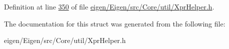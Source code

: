 Definition at line \hyperlink{eigen_2_eigen_2src_2_core_2util_2_xpr_helper_8h_source_l00350}{350} of file \hyperlink{eigen_2_eigen_2src_2_core_2util_2_xpr_helper_8h_source}{eigen/\+Eigen/src/\+Core/util/\+Xpr\+Helper.\+h}.



The documentation for this struct was generated from the following file\+:\begin{DoxyCompactItemize}
\item 
eigen/\+Eigen/src/\+Core/util/\+Xpr\+Helper.\+h\end{DoxyCompactItemize}
